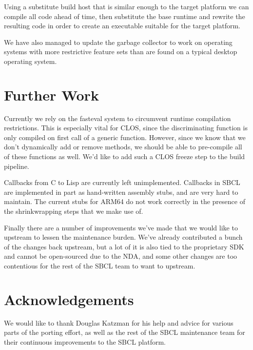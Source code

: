 \documentclass[format=sigconf]{acmart}
\begin{document}
Using a substitute build host that is similar enough to the target platform we can compile all code ahead of time, then substitute the base runtime and rewrite the resulting code in order to create an executable suitable for the target platform.

We have also managed to update the garbage collector to work on operating systems with more restrictive feature sets than are found on a typical desktop operating system.

\section{Further Work}\label{further-work}
Currently we rely on the fasteval system to circumvent runtime compilation restrictions. This is especially vital for CLOS, since the discriminating function is only compiled on first call of a generic function. However, since we know that we don't dynamically add or remove methods, we should be able to pre-compile all of these functions as well. We'd like to add such a CLOS freeze step to the build pipeline.

Callbacks from C to Lisp are currently left unimplemented. Callbacks in SBCL are implemented in part as hand-written assembly stubs, and are very hard to maintain. The current stubs for ARM64 do not work correctly in the presence of the shrinkwrapping steps that we make use of.

Finally there are a number of improvements we've made that we would like to upstream to lessen the maintenance burden. We've already contributed a bunch of the changes back upstream, but a lot of it is also tied to the proprietary SDK and cannot be open-sourced due to the NDA, and some other changes are too contentious for the rest of the SBCL team to want to upstream.

\section{Acknowledgements}\label{acknowledgements}
We would like to thank Douglas Katzman for his help and advice for various parts of the porting effort, as well as the rest of the SBCL maintenance team for their continuous improvements to the SBCL platform.


\end{document}
